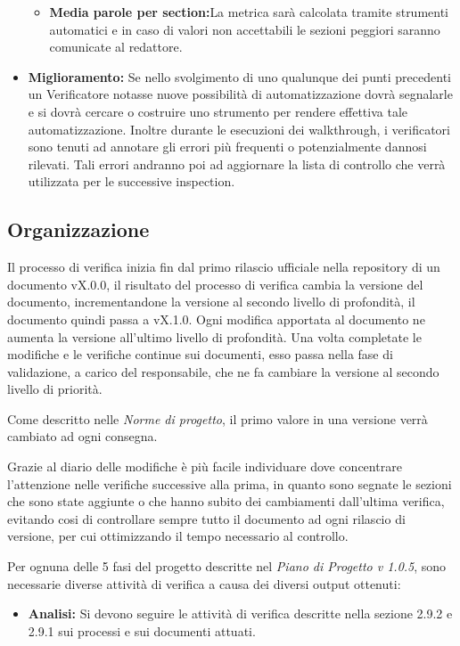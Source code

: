 \documentclass[a4paper]{article}
\begin{document}
\begin{itemize}
\begin{itemize}
						\item \textbf{Media parole per section:}La metrica sarà calcolata tramite strumenti automatici e in caso di valori non accettabili le sezioni peggiori saranno comunicate al redattore.
					\end{itemize}
					\item \textbf{Miglioramento:} Se nello svolgimento di uno qualunque dei punti precedenti un Verificatore
					notasse nuove possibilità di automatizzazione dovrà segnalarle e si dovrà cercare o costruire uno strumento per
					rendere effettiva tale automatizzazione. Inoltre durante le esecuzioni dei walkthrough, i verificatori sono
					tenuti ad annotare gli errori più frequenti o potenzialmente dannosi rilevati. Tali errori andranno poi ad
					aggiornare la lista di controllo che verrà utilizzata per le successive inspection.
				\end{itemize}		
		\subsection{Organizzazione}
			Il processo di verifica inizia fin dal primo rilascio ufficiale nella repository di un documento vX.0.0, il risultato 
			del processo di verifica cambia la versione del documento, incrementandone la versione al secondo livello di profondità, 
			il documento quindi passa a vX.1.0. Ogni modifica apportata al documento ne aumenta la versione all'ultimo livello di 
			profondità. Una volta completate le modifiche e le verifiche continue sui documenti, esso passa nella fase di validazione,
			a carico del responsabile, che ne fa cambiare la versione al secondo livello di priorità. 
			
			Come descritto nelle \emph{Norme di progetto}, il primo valore in una versione verrà cambiato ad ogni consegna.
			
			Grazie al diario delle modifiche è più facile individuare dove concentrare l’attenzione nelle verifiche successive 
			alla prima, in quanto sono segnate le sezioni che sono state aggiunte o che hanno subito dei cambiamenti dall’ultima
			 verifica, evitando cosi di controllare sempre tutto il documento ad ogni rilascio di versione, per cui ottimizzando 
			 il tempo necessario al controllo.

			Per ognuna delle 5 fasi del progetto descritte nel \emph{Piano di Progetto v 1.0.5}, sono necessarie diverse attività 
			di verifica a causa dei diversi output ottenuti:

			\begin{itemize}
				\item \textbf{Analisi:} Si devono seguire le attività di verifica descritte nella sezione 2.9.2 e 2.9.1 sui processi 
				e sui documenti attuati.
			\end{itemize}
			
\end{document}
